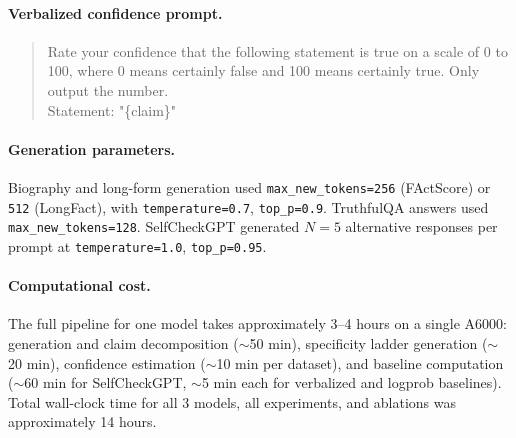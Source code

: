 \documentclass{article}
\begin{document}
\paragraph{Verbalized confidence prompt.}
\begin{quote}\small\ttfamily
Rate your confidence that the following statement is true on a scale of 0 to 100, where 0 means certainly false and 100 means certainly true. Only output the number.\\
Statement: "\{claim\}"
\end{quote}

\paragraph{Generation parameters.}
Biography and long-form generation used \texttt{max\_new\_tokens=256} (FActScore) or \texttt{512} (LongFact), with \texttt{temperature=0.7}, \texttt{top\_p=0.9}.
TruthfulQA answers used \texttt{max\_new\_tokens=128}.
SelfCheckGPT generated $N{=}5$ alternative responses per prompt at \texttt{temperature=1.0}, \texttt{top\_p=0.95}.

\paragraph{Computational cost.}
The full pipeline for one model takes approximately 3--4 hours on a single A6000: generation and claim decomposition ($\sim$50 min), specificity ladder generation ($\sim$20 min), confidence estimation ($\sim$10 min per dataset), and baseline computation ($\sim$60 min for SelfCheckGPT, $\sim$5 min each for verbalized and logprob baselines).
Total wall-clock time for all 3 models, all experiments, and ablations was approximately 14 hours.
\end{document}
